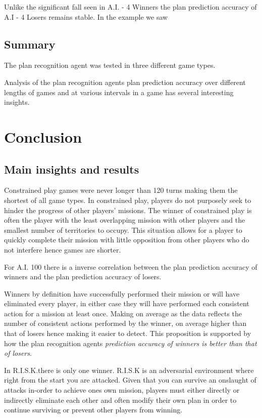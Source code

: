 \documentclass[parskip]{cs4rep}
\begin{document}
Unlike the significant fall seen in A.I. -  4 Winners the plan prediction accuracy of A.I - 4 Losers remains stable. In the example we saw

\section{Summary}

The plan recognition agent was tested in three different game types.

Analysis of the plan recognition agents plan prediction accuracy over different lengths of games and at various intervals in a game has several interesting insights.

\chapter{Conclusion}

\section{Main insights and results}

Constrained play games were never longer than 120 turns making them the shortest of all game types.
In constrained play, players do not purposely seek to hinder the progress of other players' missions. The winner of constrained play is often the player with the least overlapping mission with other players and the smallest number of territories to occupy. This situation allows for a player to quickly complete their mission with little opposition from other players who do not interfere hence games are shorter.

For A.I. 100 there is a inverse correlation between the plan prediction accuracy of winners and the plan prediction accuracy of losers.

Winners by definition have successfully performed their mission or will have eliminated every player, in either case they will have performed each consistent action for a mission at least once. Making on average as the data reflects the number of consistent actions performed by the winner, on average higher than that of losers hence making it easier to detect. This proposition is supported by how the plan recognition agents \textit{prediction accuracy of winners is better than that of losers}.

In R.I.S.K.there is only one winner. R.I.S.K is an adversarial environment where right from the start you are attacked. Given that you can survive an onslaught of attacks in-order to achieve ones own mission, players must either directly or indirectly eliminate each other and often modify their own plan in order to continue surviving or prevent other players from winning. 
\end{document}
